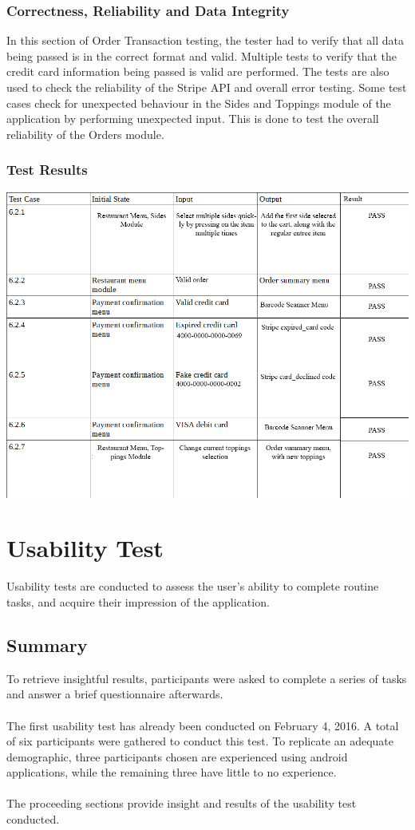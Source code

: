 \documentclass[12pt, titlepage]{article}
\begin{document}
\subsubsection{Correctness, Reliability and Data Integrity}
In this section of Order Transaction testing, the tester had to verify that all data being passed is in the correct format and valid. Multiple tests to verify that the credit card information being passed is valid are performed. The tests are also used to check the reliability of the Stripe API and overall error testing. Some test cases check for unexpected behaviour in the Sides and Toppings module of the application by performing unexpected input. This is done to test the overall reliability of the Orders module.    

\subsubsection{Test Results}
\includegraphics[width=1.2\textwidth]{orderTransactionTC.png}

\section{Usability Test}
Usability tests are conducted to assess the user's ability to complete routine tasks, and acquire their impression of the application.
\subsection{Summary}

To retrieve insightful results, participants were asked to complete a series of tasks and answer a brief questionnaire afterwards. 
\\\\
The first usability test has already been conducted on February 4, 2016. A total of six participants were gathered to conduct this test. To replicate an adequate demographic, three participants chosen are experienced using android applications, while the remaining three have little to no experience. 
\\\\
The proceeding sections provide insight and results of the usability test conducted. 
\end{document}

